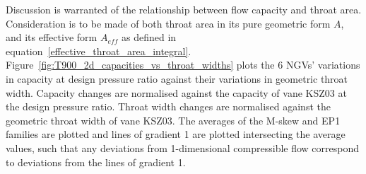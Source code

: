 \documentclass[a4paper, 11pt, oneside]{report}
\begin{document}
Discussion is warranted of the relationship between flow capacity and throat area. Consideration is to be made of both throat area in its pure geometric form $A$, and its effective form $A_{eff}$ as defined in equation~\ref{effective_throat_area_integral}. Figure~\ref{fig:T900_2d_capacities_vs_throat_widths} plots the 6 NGVs' variations in capacity at design pressure ratio against their variations in geometric throat width. Capacity changes are normalised against the capacity of vane KSZ03 at the design pressure ratio. Throat width changes are normalised against the geometric throat width of vane KSZ03. The averages of the M-skew and EP1 families are plotted and lines of gradient 1 are plotted intersecting the average values, such that any deviations from 1-dimensional compressible flow correspond to deviations from the lines of gradient 1.
\end{document}
